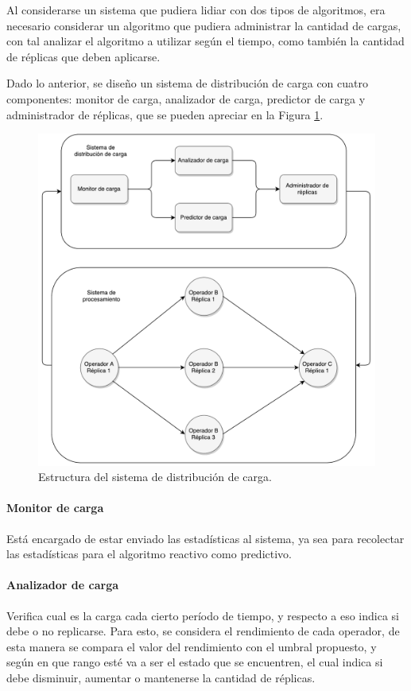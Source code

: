 Al considerarse un sistema que pudiera lidiar con dos tipos de algoritmos, era necesario considerar un algoritmo que pudiera administrar la cantidad de cargas, con tal analizar el algoritmo a utilizar según el tiempo, como también la cantidad de réplicas que deben aplicarse.

Dado lo anterior, se diseño un sistema de distribución de carga con cuatro componentes: monitor de carga, analizador de carga, predictor de carga y administrador de réplicas, que se pueden apreciar en la Figura \ref{fig:componentesSistemas}.

\begin{figure}[ht!]
  \centering
    \includegraphics[scale=0.5]{images/Diagrama.pdf}
  \caption{Estructura del sistema de distribución de carga.}
  \label{fig:componentesSistemas}
\end{figure}

\paragraph{Monitor de carga} Está encargado de estar enviado las estadísticas al sistema, ya sea para recolectar las estadísticas para el algoritmo reactivo como predictivo.

\paragraph{Analizador de carga} Verifica cual es la carga cada cierto período de tiempo, y respecto a eso indica si debe o no replicarse. Para esto, se considera el rendimiento de cada operador, de esta manera se compara el valor del rendimiento con el umbral propuesto, y según en que rango esté va a ser el estado que se encuentren, el cual indica si debe disminuir, aumentar o mantenerse la cantidad de réplicas.

